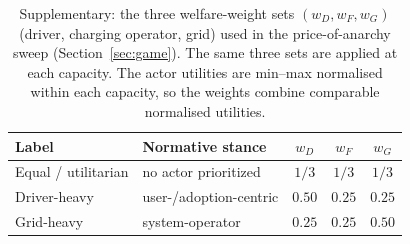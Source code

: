 \documentclass[12pt]{article}
\begin{document}
\begin{table}[H]
\centering
\caption{Supplementary: the three welfare-weight sets $(w_D,w_F,w_G)$ (driver, charging operator, grid) used in the price-of-anarchy sweep (Section~\ref{sec:game}). The same three sets are applied at each capacity. The actor utilities are min--max normalised within each capacity, so the weights combine comparable normalised utilities.}
\label{tab:weights}
\begin{tabular}{llccc}
\hline
Label & Normative stance & $w_D$ & $w_F$ & $w_G$ \\
\hline
Equal / utilitarian & no actor prioritized & $1/3$ & $1/3$ & $1/3$ \\
Driver-heavy & user-/adoption-centric & $0.50$ & $0.25$ & $0.25$ \\
Grid-heavy & system-operator & $0.25$ & $0.25$ & $0.50$ \\
\hline
\end{tabular}
\end{table}
\end{document}

